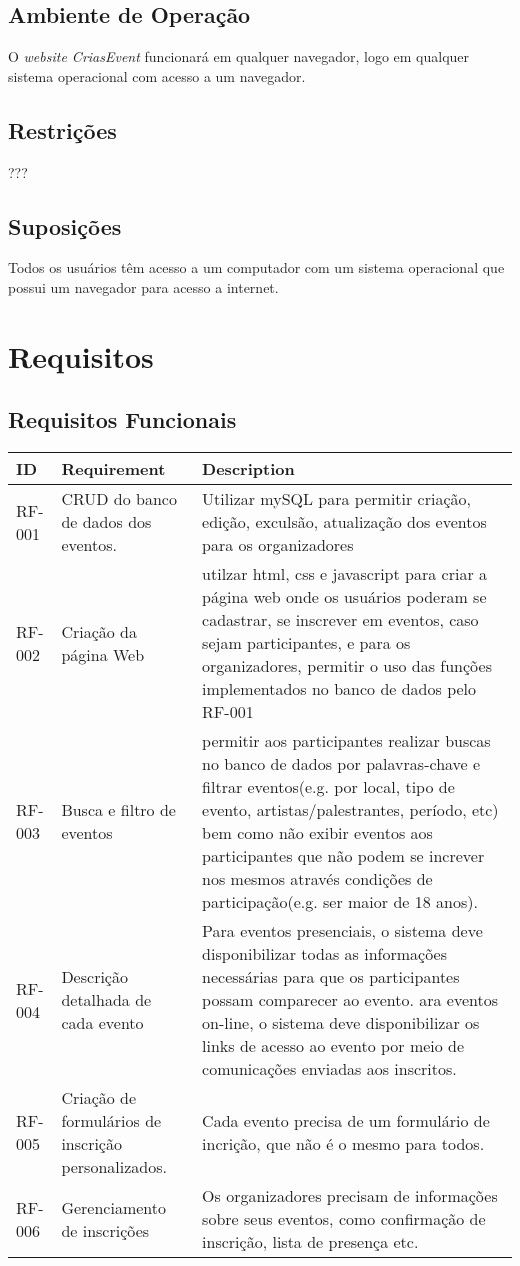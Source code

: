 \section{Ambiente de Operação}
	O \textit{website CriasEvent} funcionará em qualquer navegador, logo  em qualquer sistema operacional com acesso a um navegador.

\section{Restrições}
	???
\section{Suposições}
	Todos os usuários têm acesso a um computador com um sistema operacional que possui um navegador para acesso a internet.
\newpage




\chapter{Requisitos}
\label{Requisitos}

\section{Requisitos Funcionais}

\begin{tabular}{>{\raggedright}p{1.5cm}>{\raggedright}p{4cm}>{\raggedright}p{10cm}}
\toprule
\textbf{ID} & \textbf{Requirement} & \textbf{Description} \tabularnewline 
\midrule
RF-001 & CRUD do banco de dados dos eventos. & Utilizar mySQL para permitir criação, edição, exculsão, atualização dos eventos para os organizadores \tabularnewline \hline
RF-002 & Criação da página Web & utilzar html, css e javascript para criar a página web onde os usuários poderam se cadastrar, se inscrever em eventos,  caso sejam participantes, e para os organizadores, permitir o uso das funções implementados no banco de dados pelo RF-001 \tabularnewline \hline
RF-003 & Busca e filtro de eventos & permitir aos participantes realizar buscas no banco de dados por palavras-chave e filtrar eventos(e.g. por local, tipo de evento, artistas/palestrantes, período, etc) bem como não exibir eventos aos participantes que não podem se increver nos mesmos através condições de participação(e.g. ser maior de 18 anos). \tabularnewline \hline
RF-004 & Descrição detalhada de cada evento & Para eventos presenciais, o sistema deve disponibilizar todas as informações necessárias para que os participantes possam comparecer ao evento. ara eventos on-line, o sistema deve disponibilizar os links de acesso ao evento por meio de comunicações enviadas aos inscritos. \tabularnewline \hline
RF-005 & Criação de formulários de inscrição personalizados. & Cada evento precisa de um formulário de incrição, que não é o mesmo para todos. \tabularnewline \hline
RF-006 & Gerenciamento de inscrições & Os organizadores precisam de informações sobre seus eventos, como conﬁrmação de inscrição, lista de presença etc. \tabularnewline
\bottomrule
\end{tabular}



